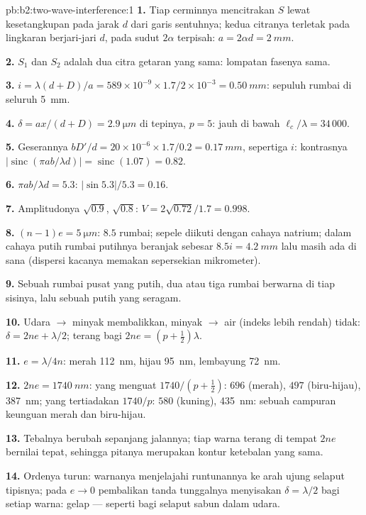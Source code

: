 \begin{solution}{pb:b2:two-wave-interference:1}
\textbf{1.} Tiap cerminnya mencitrakan $S$ lewat kesetangkupan pada jarak $d$ dari
garis sentuhnya; kedua citranya terletak pada lingkaran berjari-jari $d$, pada
sudut $2\alpha$ terpisah: $a = 2\alpha d = \qty{2}{mm}$.

\textbf{2.} $S_1$ dan $S_2$ adalah dua citra getaran yang sama: lompatan
fasenya sama.

\textbf{3.} $i = \lambda(d + D)/a = 589 \times 10^{-9} \times 1.7/2 \times 10^{-3} = \qty{0.50}{mm}$: sepuluh
rumbai di seluruh \qty{5}{mm}.

\textbf{4.} $\delta = ax/(d + D) = \qty{2.9}{\micro m}$ di tepinya, $p = 5$: jauh di bawah
$\ell_c/\lambda = 34\,000$.

\textbf{5.} Geserannya $bD'/d = 20 \times 10^{-6} \times 1.7/0.2 = \qty{0.17}{mm}$, sepertiga
$i$: kontrasnya $|\operatorname{sinc}(\pi ab/\lambda d)| = \operatorname{sinc}(1.07) = 0.82$.

\textbf{6.} $\pi ab/\lambda d = 5.3$: $|\sin5.3|/5.3 = 0.16$.

\textbf{7.} Amplitudonya $\sqrt{0.9}$, $\sqrt{0.8}$: $V = 2\sqrt{0.72}/1.7 = 0.998$.

\textbf{8.} $(n - 1)e = \qty{5}{\micro m}$: $8.5$ rumbai; sepele diikuti dengan
cahaya natrium; dalam cahaya putih rumbai putihnya beranjak sebesar $8.5i = \qty{4.2}{mm}$
lalu masih ada di sana (dispersi kacanya memakan sepersekian
mikrometer).

\textbf{9.} Sebuah rumbai pusat yang putih, dua atau tiga rumbai berwarna di
tiap sisinya, lalu sebuah putih yang seragam.

\textbf{10.} Udara $\to$ minyak membalikkan, minyak $\to$ air (indeks lebih rendah) tidak:
$\delta = 2ne + \lambda/2$; terang bagi $2ne = (p + \tfrac12)\lambda$.

\textbf{11.} $e = \lambda/4n$: merah \qty{112}{nm}, hijau \qty{95}{nm}, lembayung \qty{72}{nm}.

\textbf{12.} $2ne = \qty{1740}{nm}$: yang menguat $1740/(p + \tfrac12)$: $696$ (merah), $497$
(biru-hijau), \qty{387}{nm}; yang tertiadakan $1740/p$: $580$ (kuning), \qty{435}{nm}:
sebuah campuran keunguan merah dan biru-hijau.

\textbf{13.} Tebalnya berubah sepanjang jalannya; tiap warna terang
di tempat $2ne$ bernilai tepat, sehingga pitanya merupakan kontur ketebalan
yang sama.

\textbf{14.} Ordenya turun: warnanya menjelajahi runtunannya
ke arah ujung selaput tipisnya; pada $e \to 0$ pembalikan tanda tunggalnya menyisakan
$\delta = \lambda/2$ bagi setiap warna: gelap --- seperti bagi selaput sabun dalam udara.


\end{solution}
